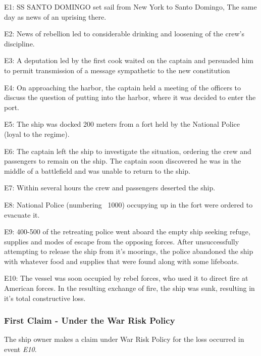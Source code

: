 E1: SS SANTO DOMINGO set sail from New York to Santo Domingo, The same day as news of an uprising there.

E2: News of rebellion led to considerable drinking and loosening of the crew's discipline. 

E3: A deputation led by the first cook waited on the captain and persuaded him to permit transmission of a message sympathetic to the new constitution

E4: On approaching the harbor, the captain held a meeting of the officers to discuss the question of putting into the harbor, where it was decided to enter the port.

E5: The ship was docked 200 meters from a fort held by the National Police (loyal to the regime).

E6: The captain left the ship to investigate the situation, ordering the crew and passengers to remain on the ship. The captain soon discovered he was in the middle of a battlefield and was unable to return to the ship. 

E7: Within several hours the crew and passengers deserted the ship.

E8: National Police (numbering ~1000) occupying up in the fort were ordered to evacuate it.  

E9: 400-500 of the retreating police went aboard the empty ship seeking refuge, supplies and modes of escape from the opposing forces. After unsuccessfully attempting to release the ship from it's moorings, the police abandoned the ship with whatever food and supplies that were found along with some lifeboats.

E10: The vessel was soon occupied by rebel forces, who used it to direct fire at American forces. In the resulting exchange of fire, the ship was sunk, resulting in it's total constructive loss.


\subsubsection{First Claim - Under the War Risk Policy}

    The ship owner makes a claim under War Risk Policy for the loss occurred in event \textit{E10}.
    
